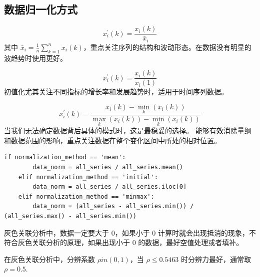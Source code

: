 \subsection{数据归一化方式}

\begin{definition}[均值化]
    $$x_i^{\prime}(k)=\frac{x_i(k)}{\bar{x}_i}$$
    其中 $\bar{x}_i=\frac{1}{n} \sum_{k=1}^n x_i(k)$，重点关注序列的结构和波动形态。在数据没有明显的波趋势时使用更好。
\end{definition}

\begin{definition}[初值化]
    $$x_i^{\prime}(k)=\frac{x_i(k)}{x_i(1)}$$
    初值化尤其关注不同指标的增长率和发展趋势时，适用于时间序列数据。
\end{definition}

\begin{definition}[归一化]
    $$x_i^{\prime}(k)=\frac{x_i(k)-\min _k\left(x_i(k)\right)}{\max _k\left(x_i(k)\right)-\min _k\left(x_i(k)\right)}$$
    当我们无法确定数据背后具体的模式时，这是最稳妥的选择。
    能够有效消除量纲和数据范围的影响，重点关注数据在整个变化区间中所处的相对位置。
\end{definition}

\begin{lstlisting}[style=python]
    if normalization_method == 'mean':
        data_norm = all_series / all_series.mean()
    elif normalization_method == 'initial':
        data_norm = all_series / all_series.iloc[0]
    elif normalization_method == 'minmax':
        data_norm = (all_series - all_series.min()) / (all_series.max() - all_series.min())
\end{lstlisting}

\begin{definition}[空值化]
    \begin{warning}
        灰色关联分析中，数据一定要大于 0，如果小于 0 计算时就会出现抵消的现象，不符合灰色关联分析的原理，如果出现小于 0 的数据，最好空值处理或者填补。
    \end{warning}
\end{definition}

\begin{definition}[分辨系数]
    在灰色关联分析中，分辨系数 $\rho in (0,1)$，当 $ \rho \leq 0.5463$ 时分辨力最好，通常取 $\rho = 0.5$.
\end{definition}

